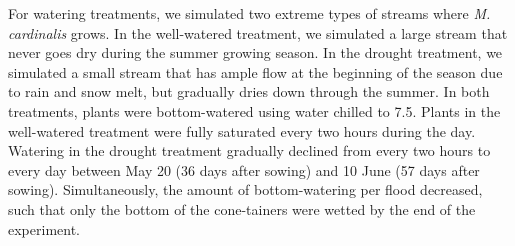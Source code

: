 \documentclass[11pt, oneside]{article}
\begin{document}
For watering treatments, we simulated two extreme types of streams where \textit{M. cardinalis} grows. In the well-watered treatment, we simulated a large stream that never goes dry during the summer growing season. In the drought treatment, we simulated a small stream that has ample flow at the beginning of the season due to rain and snow melt, but gradually dries down through the summer. In both treatments, plants were bottom-watered using  water chilled to 7.5\celsius. Plants in the well-watered treatment were fully saturated every two hours during the day. Watering in the drought treatment gradually declined from every two hours to every day between May 20 (36 days after sowing) and 10 June (57 days after sowing). Simultaneously, the amount of bottom-watering per flood decreased, such that only the bottom of the cone-tainers were wetted by the end of the experiment.
\end{document}
